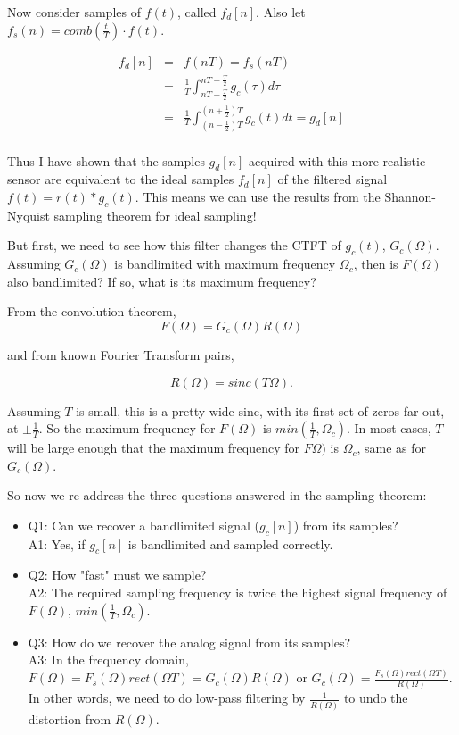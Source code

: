 \documentclass[11pt]{article}
\begin{document}
{Now consider samples of $f(t)$, called $f_d[n]$. Also let $f_s(n) = comb\left(\frac{t}{T}\right) \cdot f(t)$.

\begin{eqnarray*}
f_d[n] &=& f(nT) = f_s(nT) \\
&=& \frac{1}{T}  \int_{nT-\frac{T}{2}}^{nT+\frac{T}{2}} g_c(\tau) d\tau \\
&=& \frac{1}{T}  \int_{\left(n-\frac{1}{2}\right)T}^{\left(n+\frac{1}{2}\right)T} g_c(t) dt  = g_d[n]\\
\end{eqnarray*}

Thus I have shown that the samples $g_d[n]$ acquired with this more realistic sensor are equivalent to the ideal samples $f_d[n]$ of the filtered signal $f(t) = r(t)*g_c(t)$. This means we can use the results from the Shannon-Nyquist sampling theorem for ideal sampling!

But first, we need to see how this filter changes the CTFT of $g_c(t)$, $G_c(\Omega)$. Assuming $G_c(\Omega)$ is bandlimited with maximum frequency $\Omega_c$, then is $F(\Omega)$ also bandlimited? If so, what is its maximum frequency?

From the convolution theorem, 
\[
F(\Omega) = G_c(\Omega)R(\Omega)
\]

and from known Fourier Transform pairs, 

\[
R(\Omega) = sinc(T \Omega).
\]

Assuming $T$ is small, this is a pretty wide sinc, with its first set of zeros far out, at $\pm \frac{1}{T}$. So the maximum frequency for $F(\Omega)$ is $min(\frac{1}{T}, \Omega_c)$. In most cases, $T$ will be large enough that the maximum frequency for $F\Omega)$ is $\Omega_c$, same as for $G_c(\Omega)$.

So now we re-address the three questions answered in the sampling theorem:
\begin{itemize}
	\item Q1: Can we recover a bandlimited signal ($g_c[n]$) from its samples? \\
	\quad A1: Yes, if $g_c[n]$ is bandlimited and sampled correctly.
	\item Q2: How "fast" must we sample? \\
	\quad A2: The required sampling frequency is twice the highest signal frequency of $F(\Omega)$, $min(\frac{1}{T}, \Omega_c)$.
	\item Q3: How do we recover the analog signal from its samples? \\
	\quad A3: In the frequency domain, $F(\Omega) = F_s(\Omega) rect(\Omega T) = G_c(\Omega)R(\Omega)$ or $G_c(\Omega) = \frac{F_s(\Omega) rect(\Omega T)}{R(\Omega)}$. In other words, we need to do low-pass filtering by $\frac{1}{R(\Omega)}$ to undo the distortion from $R(\Omega)$. 
\end{itemize}
}
\end{document}
